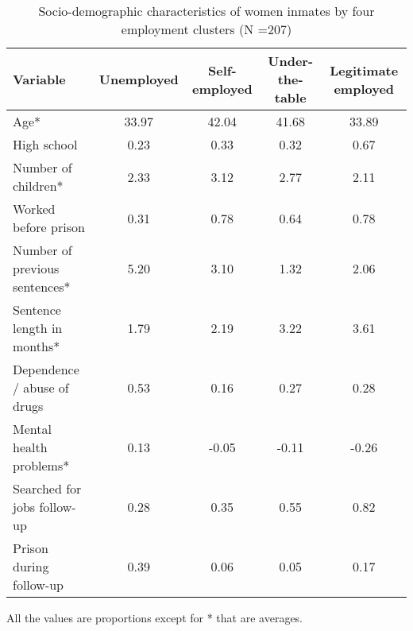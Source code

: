 \begin{table}[htp]
\footnotesize
\setlength{\tabcolsep}{10pt}
\renewcommand{\arraystretch}{1.3}
\begin{threeparttable}
\centering
\caption{Socio-demographic characteristics of women inmates \newline by four employment clusters (N =207)} 
\label{tab:descriptives_job_4}
\begin{tabular}{lcccc}
  \hline
Variable & Unemployed & Self-employed & Under-the-table & Legitimate employed \\ 
  \hline
Age* & 33.97 & 42.04 & 41.68 & 33.89 \\ 
  High school & 0.23 & 0.33 & 0.32 & 0.67 \\ 
  Number of children* & 2.33 & 3.12 & 2.77 & 2.11 \\ 
  Worked before prison & 0.31 & 0.78 & 0.64 & 0.78 \\ 
  Number of previous sentences* & 5.20 & 3.10 & 1.32 & 2.06 \\ 
  Sentence length in months* & 1.79 & 2.19 & 3.22 & 3.61 \\ 
  Dependence / abuse of drugs & 0.53 & 0.16 & 0.27 & 0.28 \\ 
  Mental health problems* & 0.13 & -0.05 & -0.11 & -0.26 \\ 
  Searched for jobs follow-up & 0.28 & 0.35 & 0.55 & 0.82 \\ 
  Prison during follow-up & 0.39 & 0.06 & 0.05 & 0.17 \\ 
   \hline
\end{tabular}
\begin{tablenotes}
\scriptsize
\item All the values are proportions except for * that are averages.
\end{tablenotes}
\end{threeparttable}
\end{table}
